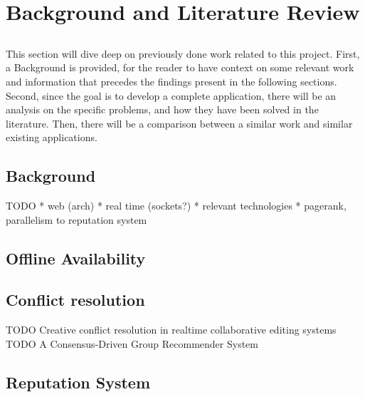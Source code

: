 \chapter{Background and Literature Review} \label{chap:sota}

\section*{}

This section will dive deep on previously done work related to this project. First, a Background is provided, for the reader to have context on some relevant work and information that precedes the findings present in the following sections. Second, since the goal is to develop a complete application, there will be an analysis on the specific problems, and how they have been solved in the literature. Then, there will be a comparison between a similar work and similar existing applications.

\section*{Background}

TODO
* web (arch)
* real time (sockets?)
* relevant technologies
* pagerank, parallelism to reputation system

\section{Offline Availability}\label{sec:offline-avail-sota}

\section{Conflict resolution}\label{sec:conflict-res-sota}

TODO Creative conflict resolution in realtime collaborative editing systems
TODO A Consensus-Driven Group Recommender System

\section{Reputation System}\label{sec:rep-sys-sota}

